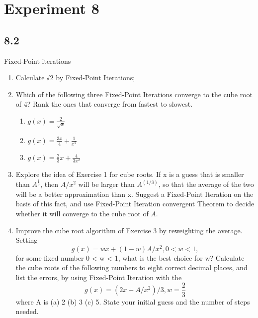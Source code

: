 \section{Experiment 8}
\subsection*{8.2}
Fixed-Point iterations

\begin{enumerate}
    \item 
    Calculate √2 by Fixed-Point Iterations;
    \item 
    Which of the following three Fixed-Point Iterations converge to the cube root of 4? Rank the ones that converge from fastest to slowest.
    \begin{enumerate}
        \item $g(x) = \frac{2}{\sqrt{x}}$
        \item $g(x) = \frac{3x}{4} + \frac{1}{x^2}$
        \item $g(x) = \frac{2}{3}x + \frac{4}{3x^2}$
    \end{enumerate}
    \item Explore the idea of Exercise 1 for cube roots. If x is a guess that is smaller than $A^{\frac{1}{3} }$, then $A/x^2$ will be larger than $A^(1/3)$, so that the average of the two will be a better approximation than x. Suggest a Fixed-Point Iteration on the basis of this fact, and use Fixed-Point Iteration convergent Theorem to decide whether it will converge to the cube root of $A$.
    \item Improve the cube root algorithm of Exercise 3 by reweighting the average. Setting
\[ g(x) = wx + (1 - w)A/x^2, 0 < w < 1, \]
for some fixed number 0 < w < 1, what is the best choice for w? Calculate the cube roots of the following numbers to eight correct decimal places, and list the errors, by using Fixed-Point Iteration with the
\[ g(x) = (2x + A/x^2)/3, w = \frac{2}{3} \]
where A is (a) 2 (b) 3 (c) 5. State your initial guess and the number of steps needed.
\end{enumerate}


